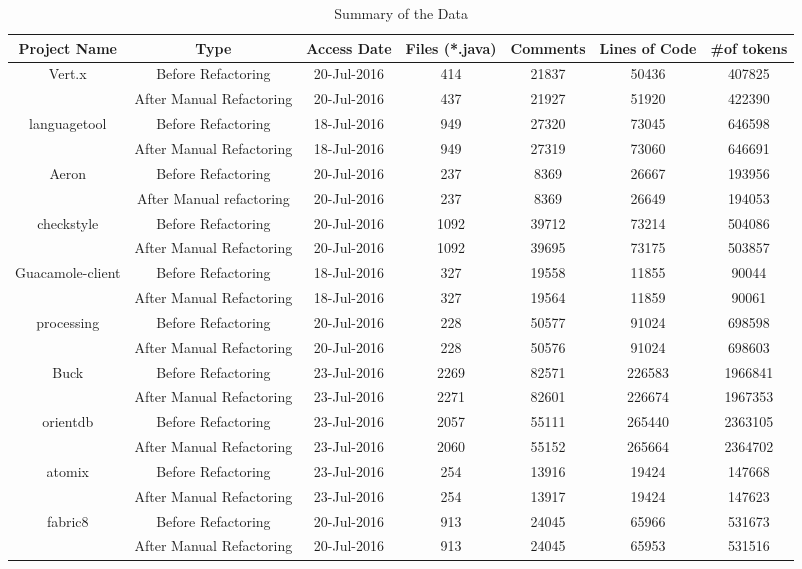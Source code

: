 \documentclass[conference]{IEEEtran}
\begin{document}
\begin{table}[t]
\centering
\caption{Summary of the Data}
\label{SuammaryTable}
 \begin{tabular}{||c c c c c c c||} 
 \hline
 Project Name & Type & Access Date & Files (*.java) & Comments & Lines of Code &  \#of tokens \\ [0.5ex] 
 \hline\hline
 Vert.x & Before Refactoring & 20-Jul-2016 & 414 & 21837 & 50436 & 407825 \\ 
 \hline
   & After Manual Refactoring & 20-Jul-2016 & 437 & 21927 & 51920 & 422390 \\
 \hline
 languagetool & Before Refactoring & 18-Jul-2016 & 949 & 27320 & 73045 & 646598 \\
 \hline
   & After Manual Refactoring & 18-Jul-2016 & 949 & 27319 & 73060 & 646691 \\
 \hline
 Aeron & Before Refactoring & 20-Jul-2016 & 237 & 8369 & 26667 & 193956 \\
 \hline
   & After Manual refactoring & 20-Jul-2016 & 237 & 8369 & 26649 & 194053 \\
   \hline
 checkstyle & Before Refactoring & 20-Jul-2016 & 1092 & 39712 & 73214 & 504086 \\
 \hline
   & After Manual Refactoring & 20-Jul-2016 & 1092 & 39695 & 73175 & 503857 \\
   \hline
  Guacamole-client & Before Refactoring & 18-Jul-2016 & 327 & 19558 & 11855 & 90044 \\
  \hline
   & After Manual Refactoring & 18-Jul-2016 & 327 & 19564 & 11859 & 90061 \\ 
  \hline
   processing & Before Refactoring & 20-Jul-2016 & 228 & 50577 & 91024 & 698598 \\
  \hline
  & After Manual Refactoring & 20-Jul-2016 & 228 & 50576 & 91024 & 698603 \\
  \hline
  Buck & Before Refactoring & 23-Jul-2016 & 2269 & 82571 & 226583 & 1966841 \\
  \hline
  & After Manual Refactoring & 23-Jul-2016 & 2271 & 82601 & 226674 & 1967353 \\
  \hline
  orientdb & Before Refactoring & 23-Jul-2016 & 2057 & 55111 & 265440 & 2363105 \\
  \hline
   & After Manual Refactoring & 23-Jul-2016 & 2060 & 55152 & 265664 & 2364702 \\
  \hline
  atomix & Before Refactoring & 23-Jul-2016 & 254 & 13916 & 19424 & 147668 \\
  \hline
    & After Manual Refactoring & 23-Jul-2016 & 254 & 13917 & 19424 & 147623 \\
  \hline
  fabric8 & Before Refactoring & 20-Jul-2016 & 913 & 24045 & 65966 & 531673 \\
   \hline
   & After Manual Refactoring & 20-Jul-2016 & 913 & 24045 & 65953 & 531516 \\ [1ex]  
 \hline
\end{tabular}
\end{table}
\end{document}

